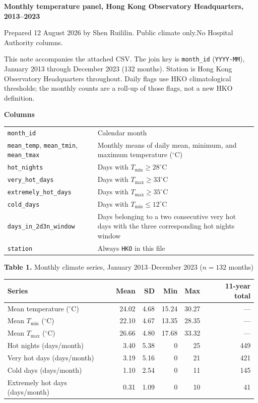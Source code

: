 \documentclass[11pt,a4paper]{article}
\begin{document}
{\Large\bfseries Monthly temperature panel, Hong Kong Observatory Headquarters, 2013--2023}

\vspace{0.15em}
{\small Prepared 12 August 2026 by Shen Ruililin.\quad
Public climate only.\quad No Hospital Authority columns.}

\vspace{0.4em}
This note accompanies the attached CSV.
The join key is \texttt{month\_id} (\texttt{YYYY-MM}), January 2013 through December 2023 (132 months).
Station is Hong Kong Observatory Headquarters throughout.
Daily flags use HKO climatological thresholds; the monthly counts are a roll-up of those flags, not a new HKO definition.

\vspace{0.2em}
{\small\bfseries Columns}

\vspace{0.15em}
{\small
\begin{tabularx}{\textwidth}{@{}l L@{}}
\toprule
\texttt{month\_id} & Calendar month \\
\texttt{mean\_temp}, \texttt{mean\_tmin}, \texttt{mean\_tmax} & Monthly means of daily mean, minimum, and maximum temperature ($^\circ$C) \\
\texttt{hot\_nights} & Days with $T_{\min}\geq 28^\circ$C \\
\texttt{very\_hot\_days} & Days with $T_{\max}\geq 33^\circ$C \\
\texttt{extremely\_hot\_days} & Days with $T_{\max}\geq 35^\circ$C \\
\texttt{cold\_days} & Days with $T_{\min}\leq 12^\circ$C \\
\texttt{days\_in\_2d3n\_window} & Days belonging to a two consecutive very hot days with the three corresponding hot nights window \\
\texttt{station} & Always \texttt{HKO} in this file \\
\bottomrule
\end{tabularx}
}

\vspace{0.45em}
{\small\bfseries Table 1.} Monthly climate series, January 2013--December 2023 ($n=132$ months)

\vspace{0.2em}
{\small
\begin{tabularx}{\textwidth}{@{}L rrrrr@{}}
\toprule
Series & Mean & SD & Min & Max & 11-year total \\
\midrule
Mean temperature ($^\circ$C) & 24.02 & 4.68 & 15.24 & 30.27 & --- \\
Mean $T_{\min}$ ($^\circ$C) & 22.10 & 4.67 & 13.35 & 28.35 & --- \\
Mean $T_{\max}$ ($^\circ$C) & 26.66 & 4.80 & 17.68 & 33.32 & --- \\
Hot nights (days/month) & 3.40 & 5.38 & 0 & 25 & 449 \\
Very hot days (days/month) & 3.19 & 5.16 & 0 & 21 & 421 \\
Cold days (days/month) & 1.10 & 2.54 & 0 & 11 & 145 \\
Extremely hot days (days/month) & 0.31 & 1.09 & 0 & 10 & 41 \\
\bottomrule
\end{tabularx}
}
\end{document}
